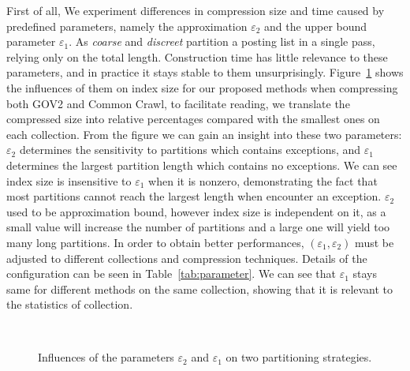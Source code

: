 \documentclass[runningheads,a4paper]{llncs}
\begin{document}
First of all, We experiment differences in compression size and time caused by predefined parameters, namely the approximation $\varepsilon_{2}$ and the upper bound parameter $\varepsilon_{1}$.
As \textit{coarse} and \textit{discreet} partition a posting list in a single pass, relying only on the total length.
Construction time has little relevance to these parameters, and in practice it stays stable to them unsurprisingly.
Figure~\ref{fig:parameter} shows the influences of them on index size for our proposed methods when compressing both GOV2 and Common Crawl, to facilitate reading, we translate the compressed size into relative percentages compared with the smallest ones on each collection.
From the figure we can gain an insight into these two parameters: $\varepsilon_{2}$ determines the sensitivity to partitions which contains exceptions, and $\varepsilon_{1}$ determines the largest partition length which contains no exceptions.
We can see index size is insensitive to $\varepsilon_{1}$ when it is nonzero, demonstrating the fact that most partitions cannot reach the largest length when encounter an exception.
$\varepsilon_{2}$ used to be approximation bound, however index size is independent on it, as a small value will increase the number of partitions and a large one will yield too many long partitions.
In order to obtain better performances, $ \left( \varepsilon_1,\varepsilon_2 \right) $ must be adjusted to different collections and compression techniques.
Details of the configuration can be seen in Table~\ref{tab:parameter}.
We can see that $ \varepsilon_1 $ stays same for different methods on the same collection, showing that it is relevant to the statistics of collection.

\begin{figure}
	\centering
	\\

	\caption{Influences of the parameters $\varepsilon_{2}$ and $\varepsilon_{1}$ on two partitioning strategies.}
	\label{fig:parameter}
\end{figure}
\end{document}
